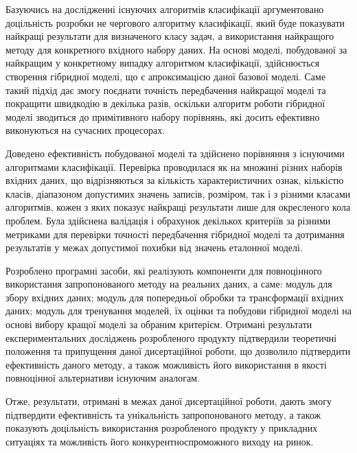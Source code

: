 Базуючись на дослідженні існуючих алгоритмів класифікації аргументовано доцільність розробки не чергового алгоритму класифікації, який буде показувати найкращі результати для визначеного класу задач, а використання найкращого методу для конкретного вхідного набору даних. На основі моделі, побудованої за найкращим у конкретному випадку алгоритмом класифікації, здійснюється створення гібридної моделі, що є апроксимацією даної базової моделі. Саме такий підхід дає змогу поєднати точність передбачення найкращої моделі та покращити швидкодію в декілька разів, оскільки алгоритм роботи гібридної моделі зводиться до примітивного набору порівнянь, які досить ефективно виконуються на сучасних процесорах.

Доведено ефективність побудованої моделі та здійснено порівняння з існуючими алгоритмами класифікації. Перевірка проводилася як на множині різних наборів вхідних даних, що відрізняються за кількість характеристичних ознак, кількістю класів, діапазоном допустимих значень записів, розміром, так і з різними класами алгоритмів, кожен з яких показує найкращі результати лише для окресленого кола проблем. Була здійснена валідація і обрахунок декількох критеріїв за різними метриками для перевірки точності передбачення гібридної моделі та дотримання результатів у межах допустимої похибки від значень еталонної моделі.

Розроблено програмні засоби, які реалізують компоненти для повноцінного використання запропонованого методу на реальних даних, а саме: модуль для збору вхідних даних; модуль для попередньої обробки та трансформації вхідних даних; модуль для тренування моделей, їх оцінки та побудови гібридної моделі на основі вибору кращої моделі за обраним критерієм. Отримані результати експериментальних досліджень розробленого продукту підтвердили теоретичні положення та припущення даної дисертаційної роботи, що дозволило підтвердити ефективність даного методу, а також можливість його використання в якості повноцінної альтернативи існуючим аналогам.

Отже, результати, отримані в межах даної дисертаційної роботи, дають змогу підтвердити ефективність та унікальність запропонованого методу, а також показують доцільність використання розробленого продукту у прикладних ситуаціях та можливість його конкурентноспроможного виходу на ринок.
